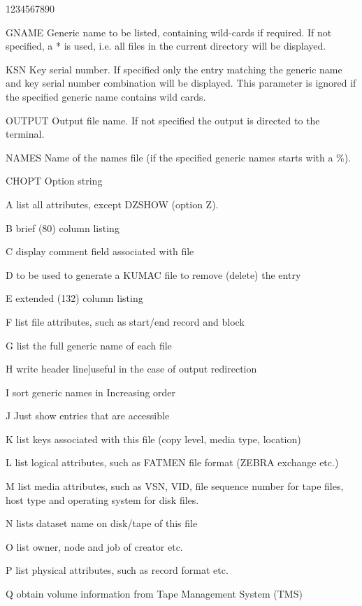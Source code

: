 \begin{DLtt}{1234567890}
\item[GNAME]Generic name to be listed, containing wild-cards if
required. If not specified, a * is used, i.e. all files in the
current directory will be displayed.
\item[KSN]Key serial number. If specified only the entry matching
the generic name and key serial number combination will be
displayed. This parameter is ignored if the specified generic
name contains wild cards.
\item[OUTPUT]Output file name. If not specified the output is directed
to the terminal.
\item[NAMES]Name of the names file (if the specified
generic names starts with a \%).
\item[CHOPT]Option string
\begin{DLtt}{12}
\item[A]list all attributes, except DZSHOW (option Z).
\item[B]brief (80) column listing
\item[C]display comment field associated with file
\item[D]to be used to generate a KUMAC file to remove (delete) the entry
\item[E]extended (132) column listing
\item[F]list file attributes, such as start/end record and block
\item[G]list the full generic name of each file
\item[H]write header line]useful in the case of output redirection 
\item[I]sort generic names in Increasing order
\item[J]Just show entries that are accessible
\item[K]list keys associated with this file (copy level, media type, location)
\item[L]list logical attributes, such as FATMEN file format
(ZEBRA exchange etc.)
\item[M]list media attributes, such as VSN, VID, file sequence number for tape
files, host type and operating system for disk files.
\item[N]lists dataset name on disk/tape of this file
\item[O]list owner, node and job of creator etc.
\item[P]list physical attributes, such as record format etc.
\item[Q]obtain volume information from Tape Management System (TMS)

\end{DLtt}
\end{DLtt}
